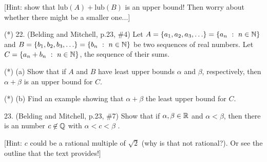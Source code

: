 \documentclass[12pt]{article}
\begin{document}
\begin{description}

\ssk

\item{\spc} [Hint: show that $\textrm{lub}(A)+\textrm{lub}(B)$ is an upper bound!
Then worry about whether there might be a smaller one...]

\msk

\item{(*) 22.} (Belding and Mitchell, p.23, \#4) Let 
$A = \{a_1,a_2,a_3, \ldots\}=\{a_n\ :\ n\in\bbn\}$ and $B = \{b_1,b_2,b_3, \ldots\}
=\{b_n\ :\ n\in{\mathbb N}\}$ be two sequences of real
numbers. Let $C = \{a_n+b_n\ :\ n\in{\mathbb N}\}$, the sequence of their sums.

\ssk
\item{(*)} (a) Show that if $A$ and $B$ have least upper bounds $\alpha$ and $\beta$, respectively,
then $\alpha+\beta$ is an upper bound for $C$.

\ssk

\item{(*)} (b) Find an example showing that $\alpha+\beta$    the least upper
bound for $C$.

\msk

\item{23.} (Belding and Mitchell, p.23, \#7) Show that if $\alpha,\beta\in{\mathbb R}$ and $\alpha<\beta$, then 
there is an  number $c\not\in{\mathbb Q}$ with $\alpha<c<\beta$ . 

\ssk

\item{\spc} [Hint: $c$ could be a rational
multiple of $\sqrt{2}$ (why is that not rational?). Or see the outline that the text provides!]

\msk


\end{description}
\vfill
\end{document}

